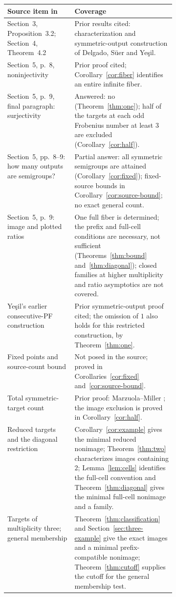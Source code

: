 \documentclass[11pt,a4paper]{article}
\theoremstyle{definition}
\theoremstyle{remark}
\begin{document}
\smallskip
\begingroup\small
\noindent\begin{tabularx}{\linewidth}{@{}p{0.40\linewidth}X@{}}
\toprule
Source item in \cite{DSY} & Coverage \\
\midrule
Section~3, Proposition~3.2; Section~4, Theorem~4.2 & Prior results cited:
characterization and symmetric-output construction of Delgado, S\"uer and Ye\c{s}il. \\
Section~5, p.~8, noninjectivity & Prior proof cited; Corollary~\ref{cor:fiber}
identifies an entire infinite fiber. \\
Section~5, p.~9, final paragraph: surjectivity & Answered: no
(Theorem~\ref{thm:one}); half of the targets at each odd Frobenius number
at least $3$ are excluded (Corollary~\ref{cor:half}). \\
Section~5, pp.~8--9: how many outputs are semigroups? & Partial answer:
all symmetric semigroups are attained (Corollary~\ref{cor:fixed});
fixed-source bounds in Corollary~\ref{cor:source-bound}; no exact general count. \\
Section~5, p.~9: image and plotted ratios & One full fiber is determined;
the prefix and full-cell conditions are necessary, not sufficient (Theorems~\ref{thm:bound} and~\ref{thm:diagonal}); closed families at higher multiplicity and ratio asymptotics are not covered. \\
Ye\c{s}il's earlier consecutive-PF construction \cite[Lemma~5.7]{Y} &
Prior symmetric-output proof cited; the omission of $1$ also holds for this
restricted construction, by Theorem~\ref{thm:one}. \\
Fixed points and source-count bound & Not posed in the source;
proved in Corollaries~\ref{cor:fixed} and~\ref{cor:source-bound}. \\
Total symmetric-target count & Prior proof: Marzuola--Miller
\cite[p.~12]{MM}; the image exclusion is proved in Corollary~\ref{cor:half}. \\
Reduced targets and the diagonal restriction &
Corollary~\ref{cor:example} gives the minimal reduced nonimage;
Theorem~\ref{thm:two} characterizes images containing $2$;
Lemma~\ref{lem:cells} identifies the full-cell convention and
Theorem~\ref{thm:diagonal} gives the minimal full-cell nonimage and a family. \\
Targets of multiplicity three; general membership &
Theorem~\ref{thm:classification} and Section~\ref{sec:three-example} give the exact images and a minimal prefix-compatible nonimage;
Theorem~\ref{thm:cutoff} supplies the cutoff for the general membership test. \\
\bottomrule
\end{tabularx}
\endgroup
\end{document}
